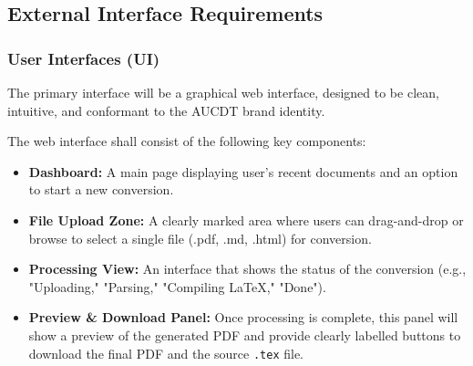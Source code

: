 \documentclass[a4paper, 11pt]{article}
\begin{document}
\subsection{External Interface Requirements}
\subsubsection{User Interfaces (UI)}
The primary interface will be a graphical web interface, designed to be clean, intuitive, and conformant to the AUCDT brand identity.
\begin{cardcontainer}[title={Web UI Specifications}]
    The web interface shall consist of the following key components:
    \begin{itemize}[label={\color{AUCDTGold}\faDesktop}]
        \item \textbf{Dashboard:} A main page displaying user's recent documents and an option to start a new conversion.
        \item \textbf{File Upload Zone:} A clearly marked area where users can drag-and-drop or browse to select a single file (.pdf, .md, .html) for conversion.
        \item \textbf{Processing View:} An interface that shows the status of the conversion (e.g., "Uploading," "Parsing," "Compiling LaTeX," "Done").
        \item \textbf{Preview \& Download Panel:} Once processing is complete, this panel will show a preview of the generated PDF and provide clearly labelled buttons to download the final PDF and the source \texttt{.tex} file.
    \end{itemize}
\end{cardcontainer}
\end{document}
